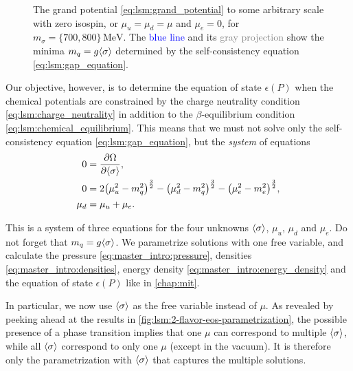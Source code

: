 \begin{figure}[t]
\caption{\label{fig:lsm:grand-potential-noisospin}%
	The grand potential \eqref{eq:lsm:grand_potential} to some arbitrary scale with zero isospin, or $\mu_u = \mu_d = \mu$ and $\mu_e=0$, for $m_\sigma=\{700,800\} \, \si{\mega\electronvolt}$.
	The \textcolor{blue}{blue line} and its \textcolor{gray}{gray projection} show the minima $m_q = g \langle \sigma \rangle$ determined by the self-consistency equation \eqref{eq:lsm:gap_equation}.
}
\end{figure}

Our objective, however, is to determine the equation of state $\epsilon(P)$
when the chemical potentials are constrained by
the charge neutrality condition \eqref{eq:lsm:charge_neutrality}
in addition to the $\beta$-equilibrium condition \eqref{eq:lsm:chemical_equilibrium}.
This means that we must not solve only the self-consistency equation \eqref{eq:lsm:gap_equation},
but the \emph{system} of equations
\begin{subequations}
\begin{align}
	0 &= \pdv{\Omega}{ \langle \sigma \rangle} , \label{eq:lsm:minsys_min} \\
	0 &= 2 \big(\mu_u^2-m_q^2\big)^\frac32 - \big(\mu_d^2-m_q^2\big)^\frac32 - \big(\mu_e^2-m_e^2\big)^\frac32 , \label{eq:lsm:minsys_charge} \\
	\mu_d &= \mu_u + \mu_e .
\end{align}%
\label{eq:lsm:minsys}%
\end{subequations}%

This is a system of three equations for the four unknowns $\langle \sigma \rangle$, $\mu_u$, $\mu_d$ and $\mu_e$.
Do not forget that $m_q = g \langle \sigma \rangle$.
We parametrize solutions with one free variable, 
and calculate the pressure \eqref{eq:master_intro:pressure}, densities \eqref{eq:master_intro:densities}, energy density \eqref{eq:master_intro:energy_density}
and the equation of state $\epsilon(P)$ like in \cref{chap:mit}.

In particular, we now use $\langle \sigma \rangle$ as the free variable instead of $\mu$.
As revealed by peeking ahead at the results in \cref{fig:lsm:2-flavor-eos-parametrization},
the possible presence of a phase transition implies that
one $\mu$ can correspond to multiple $\langle \sigma \rangle$,
while all $\langle \sigma \rangle$ correspond to only one $\mu$ (except in the vacuum).
It is therefore only the parametrization with $\langle \sigma \rangle$ that captures the multiple solutions.

